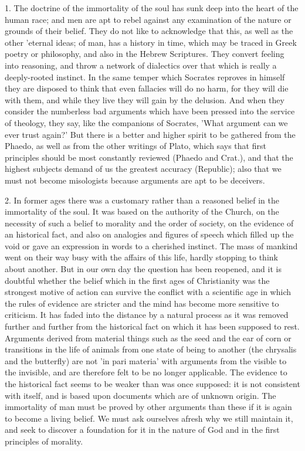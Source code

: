 1. The doctrine of the immortality of the soul has sunk deep into
the heart of the human race; and men are apt to rebel against any
examination of the nature or grounds of their belief. They do not like
to acknowledge that this, as well as the other 'eternal ideas; of
man, has a history in time, which may be traced in Greek poetry or
philosophy, and also in the Hebrew Scriptures. They convert feeling into
reasoning, and throw a network of dialectics over that which is really
a deeply-rooted instinct. In the same temper which Socrates reproves in
himself they are disposed to think that even fallacies will do no harm,
for they will die with them, and while they live they will gain by the
delusion. And when they consider the numberless bad arguments which have
been pressed into the service of theology, they say, like the companions
of Socrates, 'What argument can we ever trust again?' But there is a
better and higher spirit to be gathered from the Phaedo, as well as from
the other writings of Plato, which says that first principles should
be most constantly reviewed (Phaedo and Crat.), and that the highest
subjects demand of us the greatest accuracy (Republic); also that we
must not become misologists because arguments are apt to be deceivers.

2. In former ages there was a customary rather than a reasoned belief
in the immortality of the soul. It was based on the authority of the
Church, on the necessity of such a belief to morality and the order of
society, on the evidence of an historical fact, and also on analogies
and figures of speech which filled up the void or gave an expression
in words to a cherished instinct. The mass of mankind went on their
way busy with the affairs of this life, hardly stopping to think about
another. But in our own day the question has been reopened, and it is
doubtful whether the belief which in the first ages of Christianity
was the strongest motive of action can survive the conflict with a
scientific age in which the rules of evidence are stricter and the mind
has become more sensitive to criticism. It has faded into the distance
by a natural process as it was removed further and further from the
historical fact on which it has been supposed to rest. Arguments derived
from material things such as the seed and the ear of corn or transitions
in the life of animals from one state of being to another (the chrysalis
and the butterfly) are not 'in pari materia' with arguments from
the visible to the invisible, and are therefore felt to be no longer
applicable. The evidence to the historical fact seems to be weaker than
was once supposed: it is not consistent with itself, and is based upon
documents which are of unknown origin. The immortality of man must be
proved by other arguments than these if it is again to become a living
belief. We must ask ourselves afresh why we still maintain it, and seek
to discover a foundation for it in the nature of God and in the first
principles of morality.

